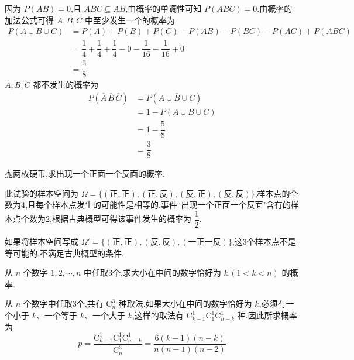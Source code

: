 \begin{solution}
    因为 $P(AB) = 0$,且 $ABC \subseteq AB$,由概率的单调性可知 $P(ABC) = 0$.由概率的加法公式可得 $A,B,C$ 中至少发生一个的概率为
    $$
    \begin{aligned}
        P(A \cup B \cup C) &= P(A) + P(B) + P(C) - P(AB) - P(BC) - P(AC) + P(ABC) \\
        &= \dfrac{1}{4} + \dfrac{1}{4} + \dfrac{1}{4} - 0 - \dfrac{1}{16} - \dfrac{1}{16} + 0 \\
        &= \dfrac{5}{8}
    \end{aligned}
    $$
    $A,B,C$ 都不发生的概率为
    $$
    \begin{aligned}
        P(\overline{A} \, \overline{B} \, \overline{C}) &= P(\overline{A \cup B \cup C}) \\
        &= 1 - P(A \cup B \cup C) \\
        &= 1 - \dfrac{5}{8} \\
        &= \dfrac{3}{8}
    \end{aligned}
    $$
\end{solution}

\question 抛两枚硬币,求出现一个正面一个反面的概率.

\begin{solution}
    此试验的样本空间为 $\varOmega = \{ (\text{正}, \text{正}), (\text{正}, \text{反}), (\text{反}, \text{正}), (\text{反}, \text{反}) \}$,样本点的个数为4,且每个样本点发生的可能性是相等的.事件``出现一个正面一个反面"含有的样本点个数为2,根据古典概型可得该事件发生的概率为 $\dfrac{1}{2}$.
\end{solution}

\begin{note}
    \indent 如果将样本空间写成 $\varOmega' = \{ (\text{正}, \text{正}), (\text{反}, \text{反}), (\text{一正一反}) \}$,这3个样本点不是等可能的,不满足古典概型的条件.
\end{note}

\question 从 $n$ 个数字 $1,2,\cdots,n$ 中任取3个,求大小在中间的数字恰好为 $k \, (1 < k < n)$ 的概率.

\begin{solution}
    从 $n$ 个数字中任取3个,共有 $\mathrm{C}_{n}^3$ 种取法.如果大小在中间的数字恰好为 $k$,必须有一个小于 $k$、一个等于 $k$、一个大于 $k$,这样的取法有 $\mathrm{C}_{k-1}^1 \mathrm{C}_1^1 \mathrm{C}_{n-k}^1$ 种.因此所求概率为
    $$
    p = \dfrac{\mathrm{C}_{k-1}^1 \mathrm{C}_1^1 \mathrm{C}_{n-k}^1}{\mathrm{C}_{n}^3} = \dfrac{6(k-1)(n-k)}{n(n-1)(n-2)}
    $$
\end{solution}

